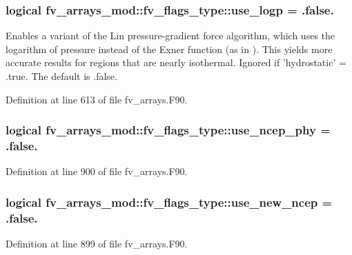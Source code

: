 \subsubsection[{use\-\_\-logp}]{\setlength{\rightskip}{0pt plus 5cm}logical fv\-\_\-arrays\-\_\-mod\-::fv\-\_\-flags\-\_\-type\-::use\-\_\-logp = .false.}\label{structfv__arrays__mod_1_1fv__flags__type_a6fa8ab036af819f76ae61c9ae8e81adc}


Enables a variant of the Lin pressure-\/gradient force algorithm, which uses the logarithm of pressure instead of the Exner function (as in \cite{lin1997explicit}). This yields more accurate results for regions that are nearly isothermal. Ignored if 'hydrostatic' = .true. The default is .false. 



Definition at line 613 of file fv\-\_\-arrays.\-F90.

\subsubsection[{use\-\_\-ncep\-\_\-phy}]{\setlength{\rightskip}{0pt plus 5cm}logical fv\-\_\-arrays\-\_\-mod\-::fv\-\_\-flags\-\_\-type\-::use\-\_\-ncep\-\_\-phy = .false.}\label{structfv__arrays__mod_1_1fv__flags__type_a7ef4fa9739e6f84e06a89be8a7ed1739}


Definition at line 900 of file fv\-\_\-arrays.\-F90.

\subsubsection[{use\-\_\-new\-\_\-ncep}]{\setlength{\rightskip}{0pt plus 5cm}logical fv\-\_\-arrays\-\_\-mod\-::fv\-\_\-flags\-\_\-type\-::use\-\_\-new\-\_\-ncep = .false.}\label{structfv__arrays__mod_1_1fv__flags__type_a2b8599245902e918b0d12b82b6bd56cf}


Definition at line 899 of file fv\-\_\-arrays.\-F90.

